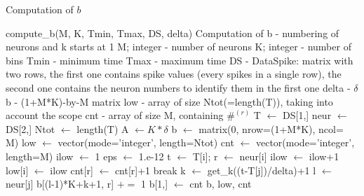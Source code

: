 \documentclass{article}
\def\Tmin{T_{\min}}
\def\Tmax{T^{\max}}
\begin{document}
  \begin{algorithm}[!h]
\caption{Computation of $b$}
\begin{algorithmic}[1] 
\Use compute\_b(M, K, Tmin, Tmax, DS, delta)
  \Desc Computation of b - numbering of neurons and k starts at 1
  \Input M; integer - number of neurons
  \Input K; integer - number of bins
\Input Tmin - minimum time
\Input Tmax - maximum time
\Input DS - DataSpike: matrix with two rows, the first one contains spike values (every spikes in a single row), the second one contains the neuron numbers to identify them in the first one
\Input delta - $\delta$
\Output b - (1+M*K)-by-M matrix%
\Output low - array of size Ntot(=length(T)), taking into account the scope
\Output cnt - array of size M, containing $\#^{(r)}$
\State T $\gets$ DS[1,]  
\State neur $\gets$ DS[2,] 
\State Ntot $\gets$ length(T) 
\State A $\gets K*\delta$ 
\State b $\gets$ matrix(0, nrow=(1+M*K), ncol= M) 
\State low $\gets$ vector(mode='integer', length=Ntot) 
\State cnt $\gets$ vector(mode='integer', length=M) 
\State ilow $\gets$ 1
\State eps $\gets$ 1.e-12 
 
\State t $\gets$ T[i]; r $\gets$ neur[i]
\State ilow $\gets$ ilow+1
\EndWhile
\State low[i] $\gets$ ilow
\If{($\Tmin<t\leq\Tmax$)}
\State cnt[r] $\gets$ cnt[r]+1
\EndIf
{}
\State break
\EndIf
\State k $\gets$ get\_k((t-T[j])/delta)+1 
\State l $\gets$ neur[j]
\State b[(l-1)*K+k+1, r] $\mathrel{+}=$ 1
\EndFor
\EndFor
\State b[1,]  $\gets$ cnt 
\State \Return b, low, cnt
\end{algorithmic}
\end{algorithm}
\clearpage
\vspace*{-2cm}
\end{document}
